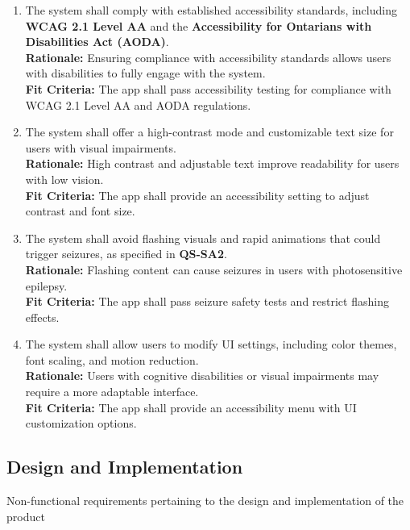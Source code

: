 \documentclass{article}
\begin{document}
\begin{enumerate}[align=left, label=\textbf{QS-AC\arabic*.}]
    \item The system shall comply with established accessibility standards, including \textbf{WCAG 2.1 Level AA} and the \textbf{Accessibility for Ontarians with Disabilities Act (AODA)}. \\
          {\bf Rationale:} Ensuring compliance with accessibility standards allows users with disabilities to fully engage with the system. \\
          {\bf Fit Criteria:} The app shall pass accessibility testing for compliance with WCAG 2.1 Level AA and AODA regulations.

    \item The system shall offer a high-contrast mode and customizable text size for users with visual impairments. \\
          {\bf Rationale:} High contrast and adjustable text improve readability for users with low vision. \\
          {\bf Fit Criteria:} The app shall provide an accessibility setting to adjust contrast and font size.

    \item The system shall avoid flashing visuals and rapid animations that could trigger seizures, as specified in \textbf{QS-SA2}. \\
          {\bf Rationale:} Flashing content can cause seizures in users with photosensitive epilepsy. \\
          {\bf Fit Criteria:} The app shall pass seizure safety tests and restrict flashing effects.

    \item The system shall allow users to modify UI settings, including color themes, font scaling, and motion reduction. \\
          {\bf Rationale:} Users with cognitive disabilities or visual impairments may require a more adaptable interface. \\
          {\bf Fit Criteria:} The app shall provide an accessibility menu with UI customization options.
\end{enumerate}


\subsection{Design and Implementation}

Non-functional requirements pertaining to the design and implementation of the product
\end{document}
